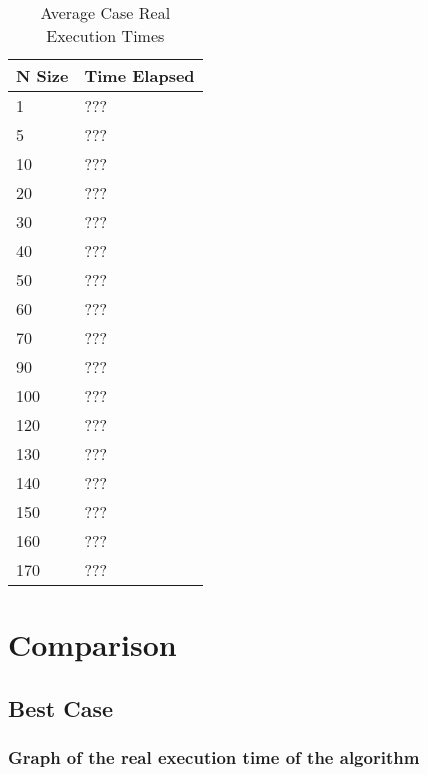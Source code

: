 \documentclass[11pt, oneside, a4paper]{article}
\begin{document}
	\begin{table}[H]
		\centering
		\begin{tabular}{|l|l|} \hline
			\textbf{N Size} & \textbf{Time Elapsed} \\ \hline
			1 & ??? \\ \hline
			5 & ??? \\ \hline
			10 & ??? \\ \hline
			20 & ??? \\ \hline
			30 & ??? \\ \hline
			40 & ??? \\ \hline
			50 & ??? \\ \hline
			60 & ??? \\ \hline
			70 & ??? \\ \hline
			90 & ??? \\ \hline
			100 & ??? \\ \hline
			120 & ??? \\ \hline
			130 & ??? \\ \hline
			140 & ??? \\ \hline
			150 & ??? \\ \hline
			160 & ??? \\ \hline
			170 & ??? \\ \hline
		\end{tabular}
		\caption{Average Case Real Execution Times}
		\label{tab:avg-case}
	\end{table}

	\section{Comparison}

	\subsection{Best Case}

	\subsubsection{Graph of the real execution time of the algorithm}

\end{document}
